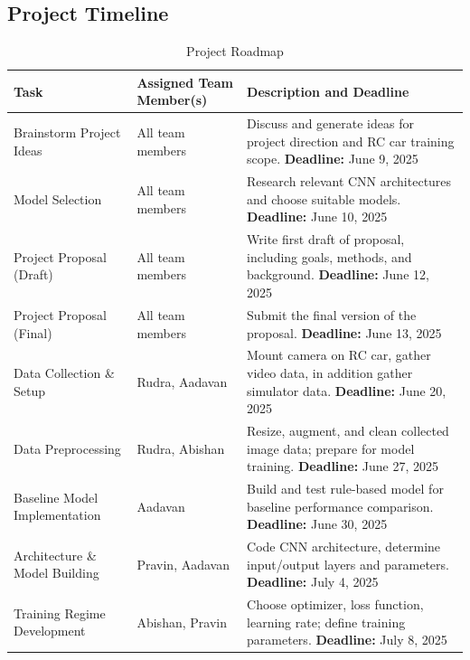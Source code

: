 \documentclass{article} %
\begin{document}
\subsection{Project Timeline}
\begin{table}[H]
\caption{Project Roadmap}
\centering
\begin{tabular}{|p{4.5cm}|p{3.5cm}|p{6cm}|}
\hline
\textbf{Task} & \textbf{Assigned Team Member(s)} & \textbf{Description and Deadline} \\ \hline
Brainstorm Project Ideas & All team members & Discuss and generate ideas for project direction and RC car training scope. \newline \textbf{Deadline:} June 9, 2025 \\ \hline
Model Selection & All team members & Research relevant CNN architectures and choose suitable models. \newline \textbf{Deadline:} June 10, 2025 \\ \hline
Project Proposal (Draft) & All team members & Write first draft of proposal, including goals, methods, and background. \newline \textbf{Deadline:} June 12, 2025 \\ \hline
Project Proposal (Final) & All team members & Submit the final version of the proposal. \newline \textbf{Deadline:} June 13, 2025 \\ \hline
Data Collection \& Setup & Rudra, Aadavan & Mount camera on RC car, gather video data, in addition gather simulator data. \newline \textbf{Deadline:} June 20, 2025 \\ \hline
Data Preprocessing & Rudra, Abishan & Resize, augment, and clean collected image data; prepare for model training. \newline \textbf{Deadline:} June 27, 2025 \\ \hline
Baseline Model Implementation & Aadavan & Build and test rule-based model for baseline performance comparison. \newline \textbf{Deadline:} June 30, 2025 \\ \hline
Architecture \& Model Building & Pravin, Aadavan & Code CNN architecture, determine input/output layers and parameters. \newline \textbf{Deadline:} July 4, 2025 \\ \hline
Training Regime Development & Abishan, Pravin & Choose optimizer, loss function, learning rate; define training parameters. \newline \textbf{Deadline:} July 8, 2025 \\ \hline

\end{tabular}
\end{table}
\end{document}
